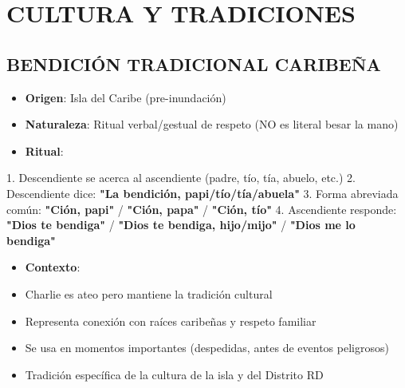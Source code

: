 \documentclass[11pt,a4paper]{report}
\begin{document}
\section{CULTURA Y TRADICIONES}

\subsection{BENDICIÓN TRADICIONAL CARIBEÑA}
\begin{itemize}
  \item \textbf{Origen}: Isla del Caribe (pre-inundación)
  \item \textbf{Naturaleza}: Ritual verbal/gestual de respeto (NO es literal besar la mano)
  \item \textbf{Ritual}:
\end{itemize}
  1. Descendiente se acerca al ascendiente (padre, tío, tía, abuelo, etc.)
  2. Descendiente dice: \textbf{"La bendición, papi/tío/tía/abuela"}
  3. Forma abreviada común: \textbf{"Ción, papi"} / \textbf{"Ción, papa"} / \textbf{"Ción, tío"}
  4. Ascendiente responde: \textbf{"Dios te bendiga"} / \textbf{"Dios te bendiga, hijo/mijo"} / \textbf{"Dios me lo bendiga"}
\begin{itemize}
  \item \textbf{Contexto}: 
  \item Charlie es ateo pero mantiene la tradición cultural
  \item Representa conexión con raíces caribeñas y respeto familiar
  \item Se usa en momentos importantes (despedidas, antes de eventos peligrosos)
  \item Tradición específica de la cultura de la isla y del Distrito RD

\end{itemize}
\end{document}
